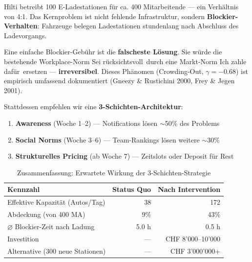\documentclass[11pt,a4paper]{article}
\begin{document}
Hilti betreibt 100 E-Ladestationen f\"ur ca. 400 Mitarbeitende --- ein Verh\"altnis von 4:1. Das Kernproblem ist nicht fehlende Infrastruktur, sondern \textbf{Blockier-Verhalten}: Fahrzeuge belegen Ladestationen stundenlang nach Abschluss des Ladevorgangs.

\begin{keyinsight}
Eine einfache Blockier-Geb\"uhr ist die \textbf{falscheste L\"osung}. Sie w\"urde die bestehende Workplace-Norm \guillemotleft Sei r\"ucksichtsvoll\guillemotright\ durch eine Markt-Norm \guillemotleft Ich zahle daf\"ur\guillemotright\ ersetzen --- \textbf{irreversibel}. Dieses Ph\"anomen (Crowding-Out, $\gamma = -0.68$) ist empirisch umfassend dokumentiert (Gneezy \& Rustichini 2000, Frey \& Jegen 2001).
\end{keyinsight}

Stattdessen empfehlen wir eine \textbf{3-Schichten-Architektur}:

\begin{enumerate}[leftmargin=2cm]
\item[\textbf{Schicht 1:}] \textbf{Awareness} (Woche 1--2) --- Notifications l\"osen $\sim$50\% des Problems
\item[\textbf{Schicht 2:}] \textbf{Social Norms} (Woche 3--6) --- Team-Rankings l\"osen weitere $\sim$30\%
\item[\textbf{Schicht 3:}] \textbf{Strukturelles Pricing} (ab Woche 7) --- Zeitslots oder Deposit f\"ur Rest
\end{enumerate}

\begin{table}[H]
\centering
{}
\begin{tabular}{lrr}
\toprule
\textbf{\color{fadarkblue}Kennzahl} & \textbf{\color{fadarkblue}Status Quo} & \textbf{\color{fadarkblue}Nach Intervention} \\
\midrule
Effektive Kapazit\"at (Autos/Tag) & 38 & 172 \\
Abdeckung (von 400 MA) & 9\% & 43\% \\
$\varnothing$ Blockier-Zeit nach Ladung & 5.0 h & 0.5 h \\
Investition & --- & CHF 8'000--10'000 \\
Alternative (300 neue Stationen) & --- & CHF 3'000'000+ \\
\bottomrule
\end{tabular}
\caption{Zusammenfassung: Erwartete Wirkung der 3-Schichten-Strategie}
\end{table}
\end{document}
